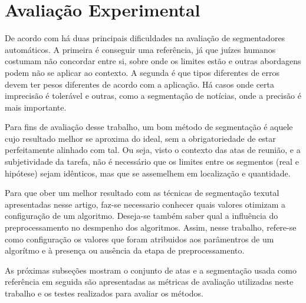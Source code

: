 
\section{Avaliação Experimental}
\label{sec:avaliacao}





De acordo com \cite{Pevzner2002} há duas principais dificuldades na avaliação de segmentadores automáticos. A primeira é conseguir uma referência, já que juízes humanos costumam não concordar entre si, sobre onde os limites estão e outras abordagens podem não se aplicar ao contexto. A segunda é que tipos diferentes de erros devem ter pesos diferentes de acordo com a aplicação. Há casos onde certa imprecisão é tolerável e outras, como a segmentação de notícias, onde a precisão é mais importante.


Para fins de avaliação desse trabalho, um bom método de segmentação é aquele cujo resultado melhor se aproxima do ideal, sem a obrigatoriedade de estar perfeitamente alinhado com tal. Ou seja, visto o contexto das atas de reunião, e a subjetividade da tarefa, não é necessário que os limites entre os segmentos (real e hipótese) sejam idênticos, mas que se assemelhem em localização e quantidade.



%
Para que ober um melhor resultado com as técnicas de segmentação texutal apresentadas nesse artigo, faz-se necessario conhecer quais valores otimizam a configuração de um algoritmo.
% 
Deseja-se também saber qual a influência do preprocessamento no desmpenho dos algoritmos.
% 
Assim, nesse trabalho, refere-se como configuração os valores que foram atribuidos aos parâmentros de um algorítmo e à presença ou ausência da etapa de preprocessamento.






As próximas subseções mostram o conjunto de atas e a segmentação usada como referência em seguida são apresentadas as métricas de avaliação utilizadas neste trabalho e os testes realizados para avaliar os métodos.



